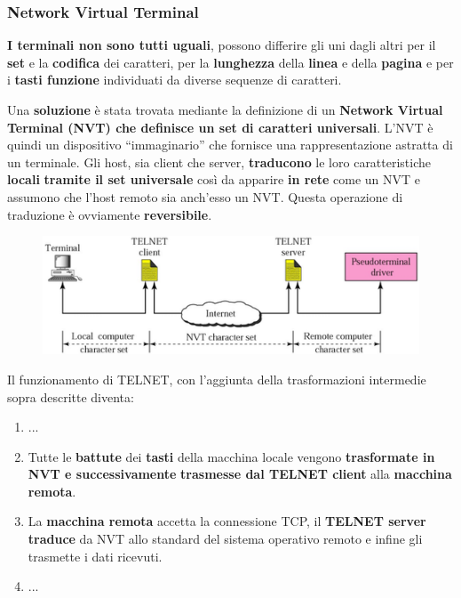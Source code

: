 \documentclass[11pt,a4paper,oneside]{book}
\theoremstyle{definition}
\begin{document}
\pagebreak

\subsubsection{Network Virtual Terminal}
\begin{flushleft}
	\textbf{I terminali non sono tutti uguali}, possono differire gli uni dagli altri per il \textbf{set} e la \textbf{codifica} dei caratteri, per la \textbf{lunghezza} della \textbf{linea} e della \textbf{pagina} e per i \textbf{tasti funzione} individuati da diverse sequenze di caratteri.
\end{flushleft}
Una \textbf{soluzione} è stata trovata mediante la definizione di un \textbf{Network Virtual  Terminal (NVT) che definisce un \textbf{set di caratteri universali}}.
L’NVT è quindi un dispositivo “immaginario” che fornisce una
rappresentazione astratta di un terminale. Gli host, sia client
che server, \textbf{traducono} le loro caratteristiche \textbf{locali} \textbf{tramite il set universale} così da apparire \textbf{in rete} come un NVT e assumono che l’host remoto sia anch'esso un NVT. Questa operazione di traduzione è ovviamente \textbf{reversibile}.
\begin{figure}[!h]
	\includegraphics[scale=0.6]{Immagini/NVT.png}
	\centering
\end{figure}
\newline
Il funzionamento di TELNET, con l'aggiunta della trasformazioni intermedie sopra descritte diventa:
\begin{enumerate}
	\item ...
	\item  Tutte le \textbf{battute} dei \textbf{tasti} della macchina locale vengono \textbf{trasformate in NVT e successivamente} \textbf{trasmesse dal TELNET client}
	      alla \textbf{macchina remota}.
	\item La \textbf{macchina remota} accetta la connessione TCP, il \textbf{TELNET server} \textbf{traduce} da NVT allo standard del sistema operativo remoto e infine gli trasmette i dati ricevuti.
	\item ...
\end{enumerate}
\end{document}
